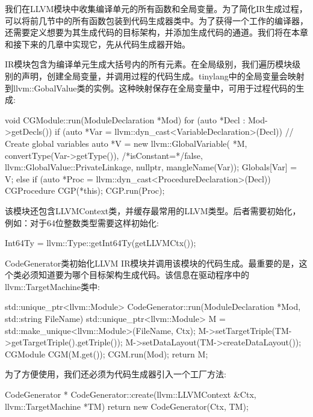 
我们在LLVM模块中收集编译单元的所有函数和全局变量。为了简化IR生成过程，可以将前几节中的所有函数包装到代码生成器类中。为了获得一个工作的编译器，还需要定义想要为其生成代码的目标架构，并添加生成代码的通道。我们将在本章和接下来的几章中实现它，先从代码生成器开始。


IR模块包含为编译单元生成大括号内的所有元素。在全局级别，我们遍历模块级别的声明，创建全局变量，并调用过程的代码生成。tinylang中的全局变量会映射到llvm::GobalValue类的实例。这种映射保存在全局变量中，可用于过程代码的生成:

\begin{cpp}
void CGModule::run(ModuleDeclaration *Mod) {
    for (auto *Decl : Mod->getDecls()) {
        if (auto *Var =
                llvm::dyn_cast<VariableDeclaration>(Decl)) {
            // Create global variables
            auto *V = new llvm::GlobalVariable(
                *M, convertType(Var->getType()),
                /*isConstant=*/false,
                llvm::GlobalValue::PrivateLinkage, nullptr,
                mangleName(Var));
            Globals[Var] = V;
        } else if (auto *Proc =
            llvm::dyn_cast<ProcedureDeclaration>(Decl)) {
            CGProcedure CGP(*this);
            CGP.run(Proc);
        }
    }
}
\end{cpp}

该模块还包含LLVMContext类，并缓存最常用的LLVM类型。后者需要初始化，例如：对于64位整数类型需要这样初始化:

\begin{cpp}
Int64Ty = llvm::Type::getInt64Ty(getLLVMCtx());
\end{cpp}

CodeGenerator类初始化LLVM IR模块并调用该模块的代码生成。最重要的是，这个类必须知道要为哪个目标架构生成代码。该信息在驱动程序中的llvm::TargetMachine类中:

\begin{cpp}
std::unique_ptr<llvm::Module>
CodeGenerator::run(ModuleDeclaration *Mod,
                   std::string FileName) {
    std::unique_ptr<llvm::Module> M =
        std::make_unique<llvm::Module>(FileName, Ctx);
    M->setTargetTriple(TM->getTargetTriple().getTriple());
    M->setDataLayout(TM->createDataLayout());
    CGModule CGM(M.get());
    CGM.run(Mod);
    return M;
}
\end{cpp}

为了方便使用，我们还必须为代码生成器引入一个工厂方法:

\begin{cpp}
CodeGenerator *
CodeGenerator::create(llvm::LLVMContext &Ctx,
                      llvm::TargetMachine *TM) {
    return new CodeGenerator(Ctx, TM);
}
\end{cpp}

